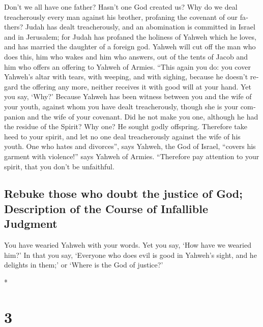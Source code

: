 \begin{paracol}{2}
\begin{otherlanguage}{english}
 Don't we all have one father? Hasn't one God created us?
Why do we deal treacherously every man against his brother, profaning
the covenant of our fathers?  Judah has dealt
treacherously, and an abomination is committed in Israel and in
Jerusalem; for Judah has profaned the holiness of Yahweh which he loves,
and has married the daughter of a foreign god.  Yahweh
will cut off the man who does this, him who wakes and him who answers,
out of the tents of Jacob and him who offers an offering to Yahweh of
Armies.  ``This again you do: you cover Yahweh's altar
with tears, with weeping, and with sighing, because he doesn't regard
the offering any more, neither receives it with good will at your hand.
 Yet you say, `Why?' Because Yahweh has been witness
between you and the wife of your youth, against whom you have dealt
treacherously, though she is your companion and the wife of your
covenant.  Did he not make you one, although he had the
residue of the Spirit? Why one? He sought godly offspring. Therefore
take heed to your spirit, and let no one deal treacherously against the
wife of his youth.  One who hates and divorces'', says
Yahweh, the God of Israel, ``covers his garment with violence!'' says
Yahweh of Armies. ``Therefore pay attention to your spirit, that you
don't be unfaithful.

\hypertarget{rebuke-those-who-doubt-the-justice-of-god-description-of-the-course-of-infallible-judgment}{%
\subsection{Rebuke those who doubt the justice of God; Description of
the Course of Infallible
Judgment}\label{rebuke-those-who-doubt-the-justice-of-god-description-of-the-course-of-infallible-judgment}}

 You have wearied Yahweh with your words. Yet you say,
`How have we wearied him?' In that you say, `Everyone who does evil is
good in Yahweh's sight, and he delights in them;' or `Where is the God
of justice?'

\end{otherlanguage}

\switchcolumn[0]*

\hypertarget{section-4}{%
\section{3}\label{section-4}}


\end{paracol}
